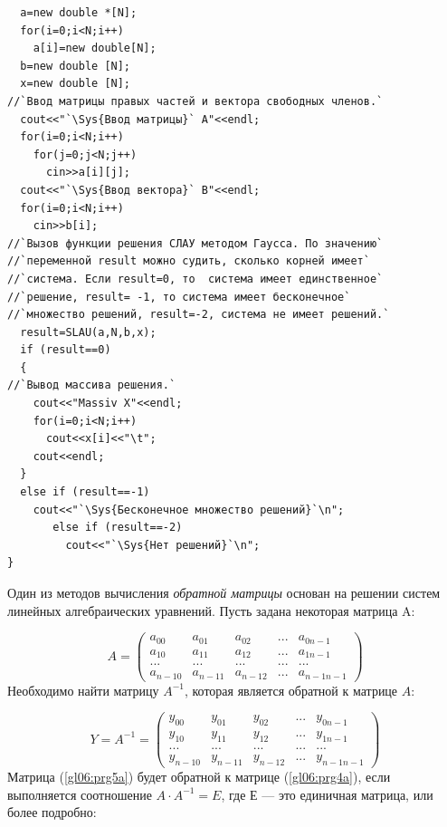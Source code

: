 \begin{lstlisting}
  a=new double *[N];
  for(i=0;i<N;i++)
    a[i]=new double[N];
  b=new double [N];
  x=new double [N];
//`Ввод матрицы правых частей и вектора свободных членов.`
  cout<<"`\Sys{Ввод матрицы}` A"<<endl;
  for(i=0;i<N;i++)
    for(j=0;j<N;j++)
      cin>>a[i][j];
  cout<<"`\Sys{Ввод вектора}` B"<<endl;
  for(i=0;i<N;i++)
    cin>>b[i];
//`Вызов функции решения СЛАУ методом Гаусса. По значению`
//`переменной result можно судить, сколько корней имеет`
//`система. Если result=0, то  система имеет единственное`
//`решение, result= -1, то система имеет бесконечное`
//`множество решений, result=-2, система не имеет решений.`
  result=SLAU(a,N,b,x);
  if (result==0)
  {
//`Вывод массива решения.`
    cout<<"Massiv X"<<endl;
    for(i=0;i<N;i++)
      cout<<x[i]<<"\t";
    cout<<endl;
  }
  else if (result==-1)
    cout<<"`\Sys{Бесконечное множество решений}`\n";
       else if (result==-2)
         cout<<"`\Sys{Нет решений}`\n";
}
\end{lstlisting}


Один из методов вычисления \emph{обратной матрицы} основан на решении
систем линейных алгебраических уравнений. Пусть задана некоторая матрица A:

\begin{equation}\label{gl06:prg4a}
A=\left(\begin{matrix}a_{00}&a_{01}&a_{02}&...&a_{0n-1}\\a_{10}&a_{11}&a_{12}&...&a_{1n-1}\\...&...&...&...&...\\a_{n-10}&a_{n-11}&a_{n-12}&...&a_{n-1n-1}\end{matrix}\right)
\end{equation}
Необходимо найти матрицу $A^{-1}$, которая является обратной к матрице $A$:

\begin{equation}\label{gl06:prg5a}
Y=A^{-1}=\left(\begin{matrix}y_{00}&y_{01}&y_{02}&...&y_{0n-1}\\y_{10}&y_{11}&y_{12}&...&y_{1n-1}\\...&...&...&...&...\\y_{n-10}&y_{n-11}&y_{n-12}&...&y_{n-1n-1}\end{matrix}\right)
\end{equation}
Матрица (\ref{gl06:prg5a}) будет обратной к матрице (\ref{gl06:prg4a}), если выполняется соотношение $A\cdot A^{-1}=E$,
где Е --- это единичная матрица, или более подробно:

